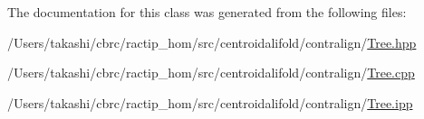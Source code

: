 The documentation for this class was generated from the following files\+:\begin{DoxyCompactItemize}
\item 
/\+Users/takashi/cbrc/ractip\+\_\+hom/src/centroidalifold/contralign/\hyperlink{_tree_8hpp}{Tree.\+hpp}\item 
/\+Users/takashi/cbrc/ractip\+\_\+hom/src/centroidalifold/contralign/\hyperlink{_tree_8cpp}{Tree.\+cpp}\item 
/\+Users/takashi/cbrc/ractip\+\_\+hom/src/centroidalifold/contralign/\hyperlink{_tree_8ipp}{Tree.\+ipp}\end{DoxyCompactItemize}
